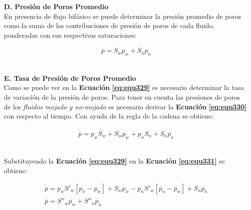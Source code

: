 \textbf{D. Presión de Poros Promedio}
\\
En presencia de flujo bifásico se puede determinar la presión promedio de poros como la suma de las contribuciones de presión de poros de cada fluido, ponderadas con sus respectivas saturaciones:

\begin{ceqn} 
\begin{gather} \label{eq:equ330} 
\overline{p} = S_w p_w + S_n p_n
\end{gather}  
\end{ceqn}
\\
\textbf{E. Tasa de Presión de Poros Promedio}
\\
Como se puede ver en la \textbf{Ecuación} \textbf{\ref{eq:equ329}} es necesario determinar la tasa de variación de la presión de poros. Para tener en cuenta las presiones de poros de los \textit{fluidos mojado y no-mojado} es necesario derivar la \textbf{Ecuación} \textbf{\ref{eq:equ330}} con respecto al tiempo. Con ayuda de la regla de la cadena se obtiene:\bigskip

\begin{ceqn} 
\begin{gather} \label{eq:equ331}
\dot{\overline{p}} = p_w\dot{S_w} + S_w\dot{p_w} + p_n\dot{S_n} + S_n\dot{p_n}
\end{gather}  
\end{ceqn}
\\
Substituyendo la \textbf{Ecuación} \textbf{\ref{eq:equ329}} en la \textbf{Ecuación} \textbf{\ref{eq:equ331}} se obtiene:

\begin{ceqn} 
\begin{subequations} \label{eq:equ332} 
\begin{gather}
\dot{\overline{p}} = p_w S'_w\left[\dot{p_n}-\dot{p_w}\right] + S_w\dot{p_w}  - p_n S'_w\left[\dot{p_n}-\dot{p_w}\right] + S_n\dot{p_n} \label{eq:equ332a} \\[12pt]
\dot{\overline{p}} = S''_w\dot{p_w} + S''_n\dot{p_n}  \label{eq:equ332b}
\end{gather}  
\end{subequations} 
\end{ceqn}

